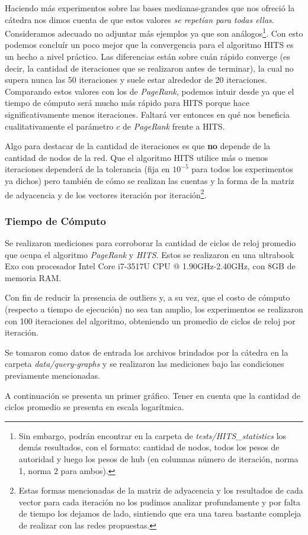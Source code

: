 	\vspace{\baselineskip}
	
	Haciendo más experimentos sobre las bases medianas-grandes que nos ofreció la cátedra nos dimos cuenta de que estos valores \textit{se repetían para todas ellas}. Consideramos adecuado no adjuntar más ejemplos ya que son análogos\footnote{Sin embargo, podrán encontrar en la carpeta de \textit{tests/HITS\_statistics} los demás resultados, con el formato: cantidad de nodos, todos los pesos de autoridad y luego los pesos de hub (en columnas número de iteración, norma 1, norma 2 para ambos).}. Con esto podemos concluír un poco mejor que la convergencia para el algoritmo HITS es un hecho a nivel práctico. Las diferencias están sobre cuán rápido converge (es decir, la cantidad de iteraciones que se realizaron antes de terminar), la cual no supera nunca las 50 iteraciones y suele estar alrededor de 20 iteraciones. Comparando estos valores con los de \textit{PageRank}, podemos intuir desde ya que el tiempo de cómputo será mucho más rápido para HITS porque hace significativamente menos iteraciones. Faltará ver entonces en qué nos beneficia cualitativamente el parámetro $c$ de \textit{PageRank} frente a HITS.
	
	 Algo para destacar de la cantidad de iteraciones es que \textbf{no} depende de la cantidad de nodos de la red. Que el algoritmo HITS utilice más o menos iteraciones dependerá de la tolerancia (fija en $10^{-5}$ para todos los experimentos ya dichos) pero también de cómo se realizan las cuentas y la forma de la matriz de adyacencia y de los vectores iteración por iteración\footnote{Estas formas mencionadas de la matriz de adyacencia y los resultados de cada vector para cada iteración no los pudimos analizar profundamente y por falta de tiempo los dejamos de lado, sintiendo que era una tarea bastante compleja de realizar con las redes propuestas.}. 

\subsubsection{Tiempo de Cómputo}	
Se realizaron mediciones para corroborar la cantidad de ciclos de reloj promedio que ocupa el algoritmo \textit{PageRank} y \textit{HITS}. Estos se realizaron en una ultrabook Exo con procesador Intel Core i7-3517U CPU @ 1.90GHz-2.40GHz, con 8GB de memoria RAM.  
\par 
Con fin de reducir la presencia de outliers y, a su vez, que el costo de cómputo (respecto a tiempo de ejecución) no sea tan amplio, los experimentos se realizaron con 100 iteraciones del algoritmo, obteniendo un promedio de ciclos de reloj por iteración.
\par 
Se tomaron como datos de entrada los archivos brindados por la cátedra en la carpeta \textit{data/query-graphs} y se realizaron las mediciones bajo las condiciones previamente mencionadas.
\par 
A continuación se presenta un primer gráfico. Tener en cuenta que la cantidad de ciclos promedio se presenta en escala logarítmica. 


